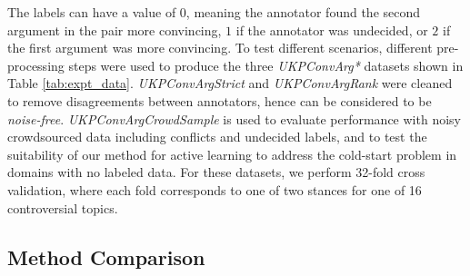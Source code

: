 The labels can have a value of $0$, meaning the annotator found the second argument in the pair more convincing,
$1$ if the annotator was undecided, or $2$ if the first argument was more convincing.
To test different scenarios, different pre-processing steps were used to produce the
three \emph{UKPConvArg*} datasets shown in Table \ref{tab:expt_data}.
\emph{UKPConvArgStrict} and \emph{UKPConvArgRank} were cleaned to remove disagreements between annotators, hence can be considered to be \emph{noise-free}.
 \emph{UKPConvArgCrowdSample} is used to evaluate performance with noisy crowdsourced data 
including conflicts and undecided labels, and to test the suitability of our method for active learning
to address the cold-start problem in domains with no labeled data.
For these datasets, we perform 32-fold cross validation, where
each fold corresponds to one of two stances for one of 16 controversial topics.
 
\subsection{Method Comparison}

